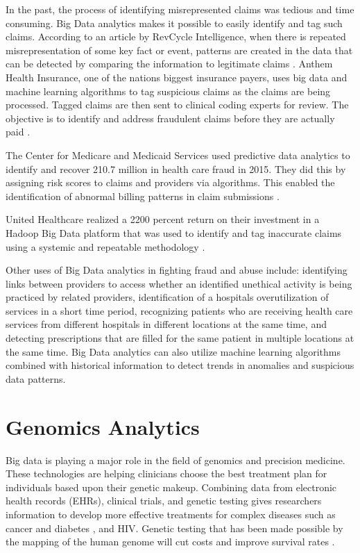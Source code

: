 \documentclass[sigconf]{acmart}
\begin{document}
In the past, the process of identifying misrepresented claims was tedious and time consuming.  Big Data analytics makes it possible to easily identify and tag such claims.  According to an article by RevCycle Intelligence, when there is repeated misrepresentation of some key fact or event, patterns are created in the data that can be detected by comparing the information to legitimate claims \cite{www-google-datameer}.  Anthem Health Insurance, one of the nations biggest insurance payers, uses big data and machine learning algorithms to tag suspicious claims as the claims are being processed.  Tagged claims are then sent to clinical coding experts for review. The objective is to identify and address fraudulent claims before they are actually paid \cite{www-google-datameer}.

The Center for Medicare and Medicaid Services used predictive data analytics to identify and recover 210.7 million \cite{www-google-McDonald} in health care fraud in 2015. They did this by assigning risk scores to claims and providers via algorithms. This enabled the identification of abnormal billing patterns in claim submissions \cite{www-google-datameer}.  

United Healthcare realized a 2200 percent return on their investment in a Hadoop Big Data platform that was used to identify and tag inaccurate claims using a systemic and repeatable methodology \cite{www-google-McDonald}.

Other uses of Big Data analytics in fighting fraud and abuse include: identifying links between providers to access whether an identified unethical activity is being practiced by related providers, identification of a hospitals overutilization of services in a short time period, recognizing patients who are receiving health care services from different hospitals in different locations at the same time, and detecting prescriptions that are filled for the same patient in multiple locations at the same time. Big Data analytics can also utilize machine learning algorithms combined with historical information to detect trends in anomalies and suspicious data patterns.  

  
\section{Genomics Analytics}
Big data is playing a major role in the field of genomics and precision medicine. These technologies are helping clinicians choose the best treatment plan for individuals based upon their genetic makeup. Combining data from electronic health records (EHRs), clinical trials, and genetic testing gives researchers information to develop more effective treatments for complex diseases such as cancer and diabetes \cite{www-google-pacient}, and HIV.  Genetic testing that has been made possible by the mapping of the human genome will cut costs and improve survival rates \cite{www-google-geno}.
\end{document}

